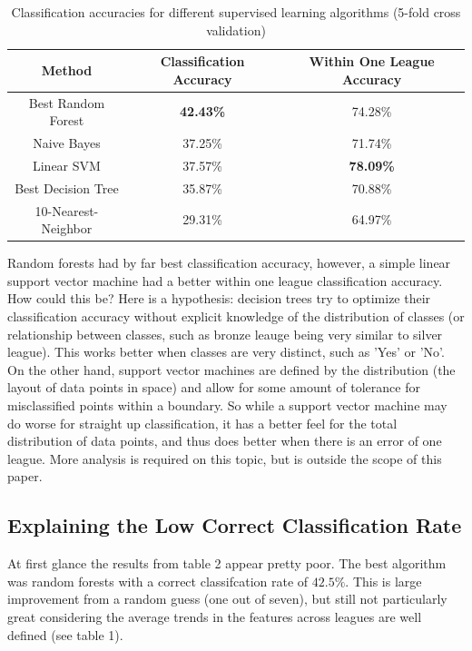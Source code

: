 \documentclass{article} %
\begin{document}
\setlength{\abovecaptionskip}{+7pt}
\begin{table}[H]
\caption {Classification accuracies for different supervised learning algorithms (5-fold cross validation)  } 
    \begin{tabular}{| c | c | c |}
    \hline
    \textbf{Method}             & \textbf{Classification Accuracy} & \textbf{Within One League Accuracy} \\ \hline
    Best Random Forest  & \textbf{42.43\%}                  & 74.28\%            \\ \hline
    Naive Bayes         & 37.25\%                  & 71.74\%            \\ \hline
    Linear SVM          & 37.57\%                  & \textbf{78.09\%}            \\ \hline
    Best Decision Tree  & 35.87\%                  & 70.88\%            \\ \hline
    10-Nearest-Neighbor & 29.31\%                  & 64.97\%            \\ \hline
    \end{tabular}
\end{table}

Random forests had by far best classification accuracy, however, a simple linear support vector machine had a better within one league classification accuracy. How could this be? Here is a hypothesis: decision trees try to optimize their classification accuracy without explicit knowledge of the distribution of classes (or relationship between classes, such as bronze leauge being very similar to silver league). This works better when classes are very distinct, such as 'Yes' or 'No'. On the other hand, support vector machines are defined by the distribution (the layout of data points in space) and allow for some amount of tolerance for misclassified points within a boundary. So while a support vector machine may do worse for straight up classification, it has a better feel for the total distribution of data points, and thus does better when there is an error of one league. More analysis is required on this topic, but is outside the scope of this paper. 

\subsection{Explaining the Low Correct Classification Rate}

At first glance the results from table 2 appear pretty poor. The best algorithm was random forests with a correct classifcation rate of \(42.5\%\). This is large improvement from a random guess (one out of seven), but still not particularly great considering the average trends in the features across leagues are well defined (see table 1).
\end{document}
